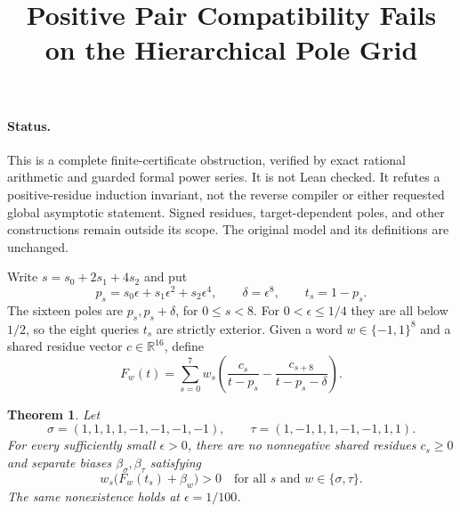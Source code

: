 \documentclass[11pt]{article}
\title{Positive Pair Compatibility Fails on the Hierarchical Pole Grid}
\author{}\date{}
\newtheorem{theorem}{Theorem}
\begin{document}
\maketitle
\paragraph{Status.}
This is a complete finite-certificate obstruction, verified by exact
rational arithmetic and guarded formal power series. It is not Lean
checked. It refutes a positive-residue induction invariant, not the
reverse compiler or either requested global asymptotic statement.
Signed residues, target-dependent poles, and other constructions remain
outside its scope. The original model and its definitions are unchanged.

Write $s=s_0+2s_1+4s_2$ and put
\[
 p_s=s_0\epsilon+s_1\epsilon^2+s_2\epsilon^4,
 \qquad \delta=\epsilon^8,\qquad t_s=1-p_s.
\]
The sixteen poles are $p_s,p_s+\delta$, for $0\leq s<8$.
For $0<\epsilon\leq1/4$ they are all below $1/2$, so the
eight queries $t_s$ are strictly exterior. Given a word
$w\in\{-1,1\}^8$ and a shared residue vector $c\in\mathbb R^{16}$,
define
\[
 F_w(t)=\sum_{s=0}^7w_s\left(
 \frac{c_s}{t-p_s}-\frac{c_{s+8}}{t-p_s-\delta}\right).
\]
\begin{theorem}
Let
\[
 \sigma=(1,1,1,1,-1,-1,-1,-1),\qquad
 \tau=(1,-1,1,1,-1,-1,1,1).
\]
For every sufficiently small $\epsilon>0$, there are no
nonnegative shared residues $c_s\geq0$ and separate biases
$\beta_\sigma,\beta_\tau$ satisfying
\[
 w_s\bigl(F_w(t_s)+\beta_w\bigr)>0
 \quad\text{for all }s\text{ and }w\in\{\sigma,\tau\}.
\]
The same nonexistence holds at $\epsilon=1/100$.
\end{theorem}
\end{document}
